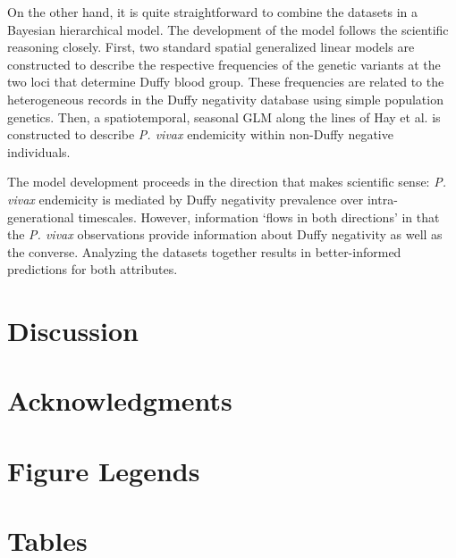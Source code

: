 \documentclass[10pt]{article}
\begin{document}
\medskip
On the other hand, it is quite straightforward to combine the datasets in a Bayesian hierarchical model. The development of the model follows the scientific reasoning closely. First, two standard spatial generalized linear models are constructed to describe the respective frequencies of the genetic variants at the two loci that determine Duffy blood group. These frequencies are related to the heterogeneous records in the Duffy negativity database using simple population genetics. Then, a spatiotemporal, seasonal GLM along the lines of Hay et al. \cite{hay:2007}  is constructed to describe \emph{P. vivax} endemicity within non-Duffy negative individuals.

The model development proceeds in the direction that makes scientific sense: \emph{P. vivax} endemicity is mediated by Duffy negativity prevalence over intra-generational timescales. However, information `flows in both directions' in that the \emph{P. vivax} observations provide information about Duffy negativity as well as the converse. Analyzing the datasets together results in better-informed predictions for both attributes. 


 

\section*{Discussion}



\section*{Acknowledgments}




\section*{Figure Legends}


\section*{Tables}
\end{document}
